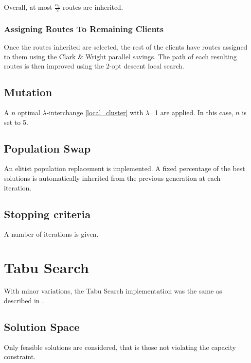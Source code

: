\documentclass{article} %
\begin{document}
Overall, at most $\frac{n_1}{2}$ routes are inherited.

\subsubsection{Assigning Routes To Remaining Clients}

Once the routes inherited are selected, the rest of the clients have routes assigned to them using the Clark \& Wright parallel savings. The path of each resulting routes is then improved using the 2-opt descent local search.


\subsection{Mutation}

A $n$ optimal $\lambda$-interchange \ref{local_cluster} with $\lambda$=1 are applied. In this case, $n$ is set to 5.


\subsection{Population Swap}

An elitist population replacement is implemented. A fixed percentage of the best solutions is automatically inherited from the previous generation at each iteration.


\subsection{Stopping criteria}

A number of iterations is given.


\newpage
\section{Tabu Search}
\label{tabu_search}

With minor variations, the Tabu Search implementation was the same as described in \citep{osman1993}.

\subsection{Solution Space}

Only feasible solutions are considered, that is those not violating the capacity constraint.
\end{document}
